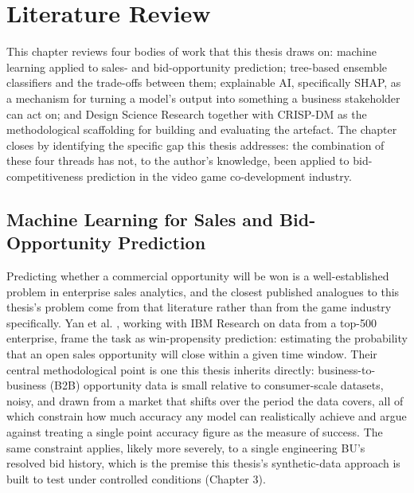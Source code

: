 \hypertarget{literature-review}{%
\chapter{Literature Review}\label{literature-review}}

This chapter reviews four bodies of work that this thesis draws on:
machine learning applied to sales- and bid-opportunity prediction;
tree-based ensemble classifiers and the trade-offs between them;
explainable AI, specifically SHAP, as a mechanism for turning a model's
output into something a business stakeholder can act on; and Design
Science Research together with CRISP-DM as the methodological
scaffolding for building and evaluating the artefact. The chapter closes
by identifying the specific gap this thesis addresses: the combination
of these four threads has not, to the author's knowledge, been applied
to bid-competitiveness prediction in the video game co-development
industry.

\hypertarget{machine-learning-for-sales-and-bid-opportunity-prediction}{%
\section{Machine Learning for Sales and Bid-Opportunity
Prediction}\label{machine-learning-for-sales-and-bid-opportunity-prediction}}

Predicting whether a commercial opportunity will be won is a
well-established problem in enterprise sales analytics, and the closest
published analogues to this thesis's problem come from that literature
rather than from the game industry specifically. Yan et al.
\citep{yan2015sales}, working with IBM Research on data from a top-500
enterprise, frame the task as win-propensity prediction: estimating the
probability that an open sales opportunity will close within a given
time window. Their central methodological point is one this thesis
inherits directly: business-to-business (B2B) opportunity data is small
relative to consumer-scale datasets, noisy, and drawn from a market that
shifts over the period the data covers, all of which constrain how much
accuracy any model can realistically achieve and argue against treating
a single point accuracy figure as the measure of success. The same
constraint applies, likely more severely, to a single engineering BU's
resolved bid history, which is the premise this thesis's synthetic-data
approach is built to test under controlled conditions (Chapter 3).

